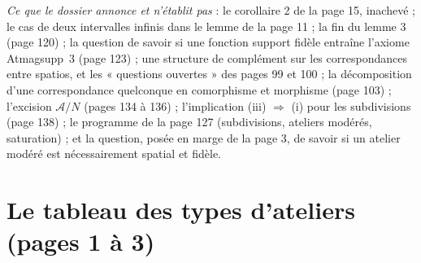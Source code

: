 \documentclass[11pt,a4paper]{article}
\begin{document}
\emph{Ce que le dossier annonce et n'établit pas} : le corollaire 2 de la page
15, inachevé ; le cas de deux intervalles infinis dans le lemme de la page 11 ;
la fin du lemme 3 (page 120) ; la question de savoir si une fonction support
fidèle entraîne l'axiome Atmagsupp~3 (page 123) ; une structure de complément
sur les correspondances entre spatios, et les « questions ouvertes » des pages
99 et 100 ; la décomposition d'une correspondance quelconque en comorphisme et
morphisme (page 103) ; l'excision $\mathcal{A}/N$ (pages 134 à 136) ;
l'implication (iii) $\Rightarrow$ (i) pour les subdivisions (page 138) ; le
programme de la page 127 (subdivisions, ateliers modérés, saturation) ; et la
question, posée en marge de la page 3, de savoir si un atelier modéré est
nécessairement spatial et fidèle.

\section*{Le tableau des types d'ateliers (pages 1 à 3)}
\end{document}
